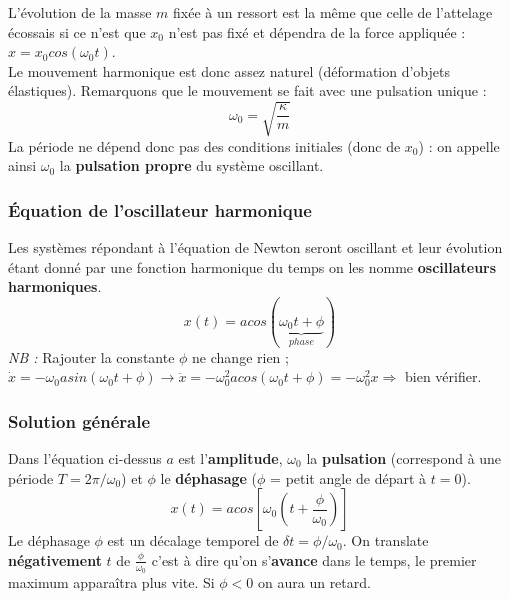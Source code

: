 \documentclass	[11pt, a4paper, openany]{book}
\begin{document}
L'évolution de la masse $m$ fixée à un ressort est la même que celle de l'attelage écossais si ce n'est que $x_0$ n'est pas fixé et dépendra de la force appliquée : $x = x_0 cos(\omega_0 t)$.\\

Le mouvement harmonique est donc assez naturel (déformation d'objets élastiques). Remarquons que le mouvement se fait avec une pulsation unique :
\begin{equation}
\omega_0 = \sqrt{\frac{\kappa}{m}}
\end{equation}
La période ne dépend donc pas des conditions initiales (donc de $x_0$) : on appelle ainsi $\omega_0$ la \textbf{pulsation propre} du système oscillant.

\subsubsection*{Équation de l'oscillateur harmonique}
Les systèmes répondant à l'équation de Newton seront oscillant et leur évolution étant donné par une fonction harmonique du temps on les nomme \textbf{oscillateurs harmoniques}.
\begin{equation}
x(t) = a cos(\underbrace{\omega_0 t + \phi}_{phase})
\end{equation}
\textit{NB :} Rajouter la constante $\phi$ ne change rien ; $\dot{x} = -\omega_0 a sin(\omega_0t+\phi) \rightarrow \ddot{x} = -\omega_0^2 a cos(\omega_0t+\phi) = -\omega_0^2 x \Rightarrow$ bien vérifier.

\subsubsection*{Solution générale}
Dans l'équation ci-dessus $a$ est l'\textbf{amplitude}, $\omega_0$ la \textbf{pulsation} (correspond à une période $T = 2\pi/\omega_0$) et $\phi$ le \textbf{déphasage} ($\phi$ = petit angle de départ à $t=0$).
\begin{equation}
x(t) = a cos\left[\omega_0\left(t + \frac{\phi}{\omega_0}\right)\right]
\end{equation}
Le déphasage $\phi$ est un décalage temporel de $\delta t = \phi/\omega_0$. On translate \textbf{négativement} $t$ de $\frac{\phi}{\omega_0}$ c'est à dire qu'on s'\textbf{avance} dans le temps, le premier maximum apparaîtra plus vite. Si $\phi < 0$ on aura un retard.
\end{document}
